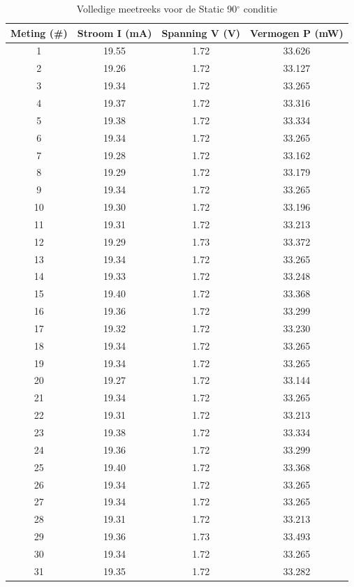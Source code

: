 \begin{table}[htbp]
\centering
\caption{Volledige meetreeks voor de Static 90$^\circ$ conditie}
\label{tab:static_90deg_data}
\begin{tabular}{c S[table-format=2.2] S[table-format=1.2] S[table-format=2.3]}
\toprule
\textbf{Meting (\#)} & {\textbf{Stroom I (mA)}} & {\textbf{Spanning V (V)}} & {\textbf{Vermogen P (mW)}} \\
  & 19.55 & 1.72 & 33.626 \\
2  & 19.26 & 1.72 & 33.127 \\
3  & 19.34 & 1.72 & 33.265 \\
4  & 19.37 & 1.72 & 33.316 \\
5  & 19.38 & 1.72 & 33.334 \\
6  & 19.34 & 1.72 & 33.265 \\
7  & 19.28 & 1.72 & 33.162 \\
8  & 19.29 & 1.72 & 33.179 \\
9  & 19.34 & 1.72 & 33.265 \\
10 & 19.30 & 1.72 & 33.196 \\
11 & 19.31 & 1.72 & 33.213 \\
12 & 19.29 & 1.73 & 33.372 \\
13 & 19.34 & 1.72 & 33.265 \\
14 & 19.33 & 1.72 & 33.248 \\
15 & 19.40 & 1.72 & 33.368 \\
16 & 19.36 & 1.72 & 33.299 \\
17 & 19.32 & 1.72 & 33.230 \\
18 & 19.34 & 1.72 & 33.265 \\
19 & 19.34 & 1.72 & 33.265 \\
20 & 19.27 & 1.72 & 33.144 \\
21 & 19.34 & 1.72 & 33.265 \\
22 & 19.31 & 1.72 & 33.213 \\
23 & 19.38 & 1.72 & 33.334 \\
24 & 19.36 & 1.72 & 33.299 \\
25 & 19.40 & 1.72 & 33.368 \\
26 & 19.34 & 1.72 & 33.265 \\
27 & 19.34 & 1.72 & 33.265 \\
28 & 19.31 & 1.72 & 33.213 \\
29 & 19.36 & 1.73 & 33.493 \\
30 & 19.34 & 1.72 & 33.265 \\
31 & 19.35 & 1.72 & 33.282 \\

\end{tabular}
\end{table}
